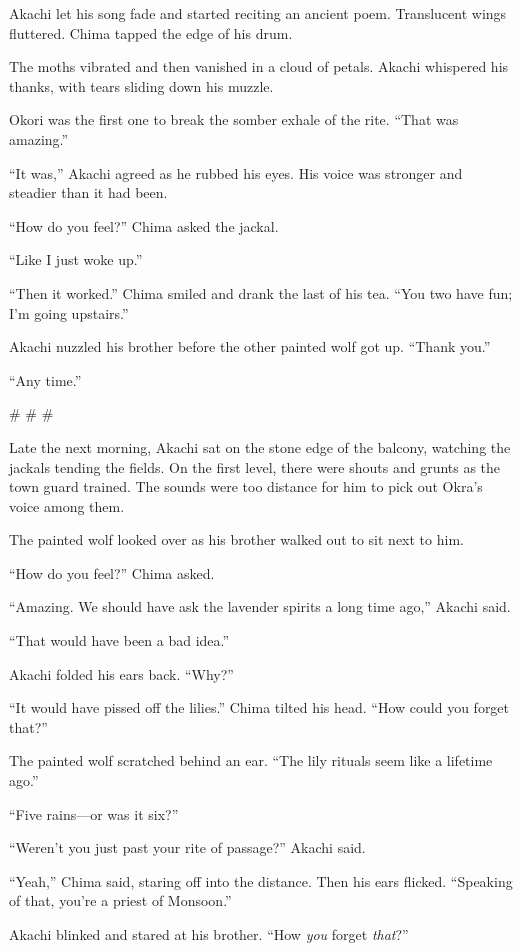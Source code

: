 Akachi let his song fade and started reciting an ancient poem. Translucent wings fluttered. Chima tapped the edge of his drum.

The moths vibrated and then vanished in a cloud of petals. Akachi whispered his thanks, with tears sliding down his muzzle.

Okori was the first one to break the somber exhale of the rite. ``That was amazing.''

``It was,'' Akachi agreed as he rubbed his eyes. His voice was stronger and steadier than it had been.

``How do you feel?'' Chima asked the jackal.

``Like I just woke up.''

``Then it worked.'' Chima smiled and drank the last of his tea. ``You two have fun; I'm going upstairs.''

Akachi nuzzled his brother before the other painted wolf got up. ``Thank you.''

``Any time.''

\# \# \#

Late the next morning, Akachi sat on the stone edge of the balcony, watching the jackals tending the fields. On the first level, there were shouts and grunts as the town guard trained. The sounds were too distance for him to pick out Okra's voice among them.

The painted wolf looked over as his brother walked out to sit next to him.

``How do you feel?'' Chima asked.

``Amazing. We should have ask the lavender spirits a long time ago,'' Akachi said.

``That would have been a bad idea.''

Akachi folded his ears back. ``Why?''

``It would have pissed off the lilies.'' Chima tilted his head. ``How could you forget that?''

The painted wolf scratched behind an ear. ``The lily rituals seem like a lifetime ago.''

``Five rains---or was it six?''

``Weren't you just past your rite of passage?'' Akachi said.

``Yeah,'' Chima said, staring off into the distance. Then his ears flicked. ``Speaking of that, you're a priest of Monsoon.''

Akachi blinked and stared at his brother. ``How \emph{you} forget \emph{that}?''

